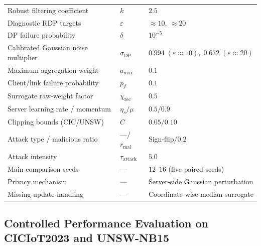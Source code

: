 \documentclass[5p,times,numafflabel]{elsarticle}
\begin{document}
\begin{table}[H]
\begin{tabularx}{\columnwidth}{
			@{}
			>{\raggedright\arraybackslash}p{}
			>{\centering\arraybackslash}p{}
			Y
			@{}}
		Robust filtering coefficient
		& \(k\)
		& \(2.5\) \\
		
	Diagnostic RDP targets
	& \(\varepsilon\)
	& \(\approx10,\ \approx20\) \\
		
		DP failure probability
		& \(\delta\)
		& \(10^{-5}\) \\
		
		Calibrated Gaussian noise multiplier
		& \(\sigma_{\mathrm{DP}}\)
		& \(0.994\;(\varepsilon\!\approx\!10),\;
		0.672\;(\varepsilon\!\approx\!20)\)  \\
		
		Maximum aggregation weight
		& \(a_{\max}\)
		& \(0.1\) \\
		
		Client/link failure probability
		& \(p_f\)
		& \(0.1\) \\
		
		Surrogate raw-weight factor
		& \(\chi_{\mathrm{rec}}\)
		& \(0.5\) \\
		
		Server learning rate / momentum
		& \(\eta_s/\mu\)
		& \(0.5/0.9\) \\
		
		Clipping bounds (CIC/UNSW)
		& \(C\)
		& \(0.05/0.10\) \\
		
		Attack type / malicious ratio
		& ---/\(r_{\mathrm{mal}}\)
		& Sign-flip/\(0.2\) \\
		
		Attack intensity
		& \(\tau_{\mathrm{attack}}\)
		& \(5.0\) \\
		
		Main comparison seeds
		& ---
		& \(12\)--\(16\) (five paired seeds) \\
	
		Privacy mechanism
		& ---
		& Server-side Gaussian perturbation \\
		Missing-update handling
		& ---
		& Coordinate-wise median surrogate \\
		
		\bottomrule
	\end{tabularx}
\end{table}


	
	\subsection{Controlled Performance Evaluation on CICIoT2023
		and UNSW-NB15}
	\label{subsec:ciciot-performance}
	
\end{document}
